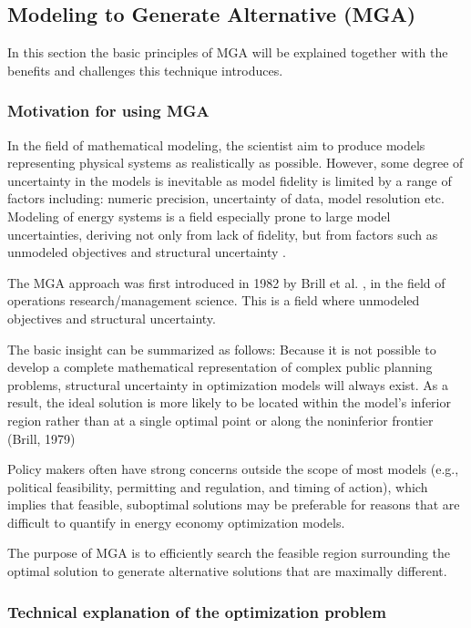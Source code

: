 \subsection{Modeling to Generate Alternative (MGA)}\label{sec:MGA}
In this section the basic principles of MGA will be explained together with the benefits and challenges this technique introduces. 

\subsubsection{Motivation for using MGA}

In the field of mathematical modeling, the scientist aim to produce models representing physical systems as realistically as possible. However, some degree of uncertainty in the models is inevitable as model fidelity is limited by a range of factors including: numeric precision, uncertainty of data, model resolution etc. Modeling of energy systems is a field especially prone to large model uncertainties, deriving not only from lack of fidelity, but from factors such as unmodeled objectives and structural uncertainty \cite{DeCarolis_MGA}. 

The MGA approach was first introduced in 1982 by Brill et al. \cite{Brill_MGA_1982}, in the field of operations research/management science. This is a field where unmodeled objectives and structural uncertainty. 


The basic insight can be
summarized as follows: Because it is not possible to develop a complete
mathematical representation of complex public planning problems,
structural uncertainty in optimization models will always exist. As a
result, the ideal solution is more likely to be located within the model's
inferior region rather than at a single optimal point or along the noninferior frontier (Brill, 1979)

Policy makers often have strong concerns outside the scope of most models
(e.g., political feasibility, permitting and regulation, and timing of
action), which implies that feasible, suboptimal solutions may be
preferable for reasons that are difficult to quantify in energy economy
optimization models.

The purpose of MGA is to efficiently search the feasible
region surrounding the optimal solution to generate alternative
solutions that are maximally different. 

\subsubsection{Technical explanation of the optimization problem}\label{sec:OptimizationProblem}


